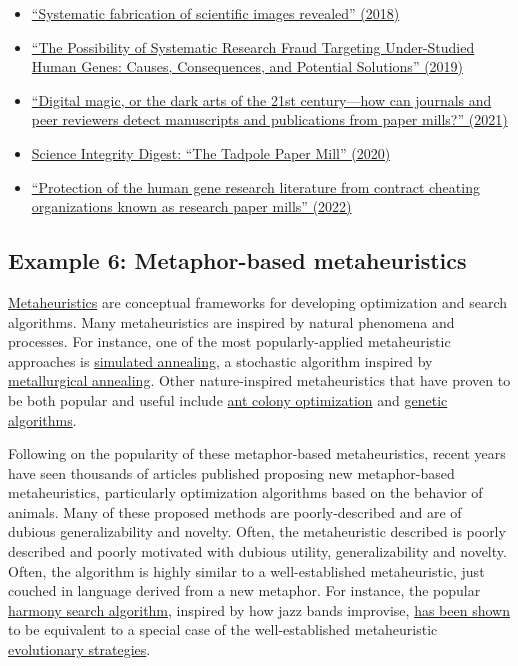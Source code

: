 \documentclass[letterpaper, 12pt]{article}
\begin{document}
\begin{itemize}
    \setlength\itemsep{-0.5em}
    \item \href{https://doi.org/10.1002/1873-3468.13201}{``Systematic fabrication of scientific images revealed'' (2018)}
    \item \href{https://doi.org/10.1177/1177271919829162}{``The Possibility of Systematic Research Fraud Targeting Under-Studied Human Genes: Causes, Consequences, and Potential Solutions'' (2019)}
    \item \href{https://doi.org/10.1002/1873-3468.13747}{``Digital magic, or the dark arts of the 21st century—how can journals and peer reviewers detect manuscripts and publications from paper mills?'' (2021)}
    \item \href{https://scienceintegritydigest.com/2020/02/21/the-tadpole-paper-mill/}{Science Integrity Digest: ``The Tadpole Paper Mill'' (2020)}
    \item \href{https://doi.org/10.1093/nar/gkac1139}{``Protection of the human gene research literature from contract cheating organizations known as research paper mills'' (2022)}

\end{itemize}

\subsection*{Example 6: Metaphor-based metaheuristics}

\href{https://en.wikipedia.org/wiki/Metaheuristic}{Metaheuristics} are conceptual frameworks for developing optimization and search algorithms. Many metaheuristics are inspired by natural phenomena and processes. For instance, one of the most popularly-applied metaheuristic approaches is \href{https://en.wikipedia.org/wiki/Simulated_annealing}{simulated annealing}, a stochastic algorithm inspired by \href{https://en.wikipedia.org/wiki/Annealing_(materials_science)}{metallurgical annealing}. Other nature-inspired metaheuristics that have proven to be both popular and useful include \href{https://en.wikipedia.org/wiki/Ant_colony_optimization_algorithms}{ant colony optimization} and \href{https://en.wikipedia.org/wiki/Genetic_algorithm}{genetic algorithms}.

Following on the popularity of these metaphor-based metaheuristics, recent years have seen thousands of articles published proposing new metaphor-based metaheuristics, particularly optimization algorithms based on the behavior of animals. Many of these proposed methods are poorly-described and are of dubious generalizability and novelty. Often, the metaheuristic described is poorly described and poorly motivated with dubious utility, generalizability and novelty. Often, the algorithm is highly similar to a well-established metaheuristic, just couched in language derived from a new metaphor. For instance, the popular \href{https://doi.org/10.1177/003754970107600201}{harmony search algorithm}, inspired by how jazz bands improvise, \href{https://doi.org/10.4018/978-1-4666-0270-0.ch005}{has been shown} to be equivalent to a special case of the well-established metaheuristic \href{https://en.wikipedia.org/wiki/Evolution_strategy}{evolutionary strategies}.
\end{document}
